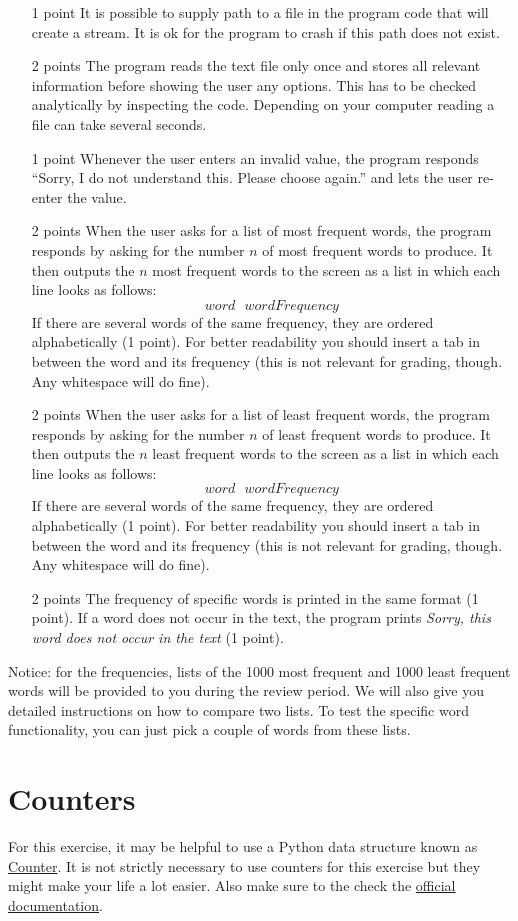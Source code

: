 \documentclass[11pt, leqno, a4paper]{article}
\begin{document}
\begin{itemize}
\item[1 point] It is possible to supply path to a file in the program code that will create a stream. It is ok for the program to crash if this path does not exist.
\item[2 points] The program reads the text file only once and stores all relevant information before showing the user any options. This has to
be checked analytically by inspecting the code. Depending on your computer reading a file can take several seconds.
\item[1 point] Whenever the user enters an invalid value, the program responds ``Sorry, I do not understand this. Please choose again.'' and lets the
user re-enter the value.
\item[2 points] When the user asks for a list of most frequent words, the program responds by asking for the number $ n $ of most frequent words to 
produce. It then outputs the $ n $ most frequent words to the screen as a list in which each line looks as follows:
$$ word~~~wordFrequency $$
If there are several words of the same frequency, they are ordered alphabetically (1 point). For better readability
you should insert a tab in between the word and its frequency (this is not relevant for grading, though. Any whitespace will do fine).
\item[2 points] When the user asks for a list of least frequent words, the program responds by asking for the number $ n $ of least frequent words to 
produce. It then outputs the $ n $ least frequent words to the screen as a list in which each line looks as follows:
$$ word~~~wordFrequency $$
If there are several words of the same frequency, they are ordered alphabetically (1 point).  For better readability
you should insert a tab in between the word and its frequency (this is not relevant for grading, though. Any whitespace will do fine).
\item[2 points] The frequency of specific words is printed in the same format (1 point). If a word does not occur in the text, the program prints \textit{Sorry, this
word does not occur in the text} (1 point).
\end{itemize}

Notice: for the frequencies, lists of the 1000 most frequent and 1000 least frequent words will be provided to you during the review period. We will also give
you detailed instructions on how to compare two lists. To test the specific word functionality, you can just pick a couple of words from these lists.

\enlargethispage{1cm}
\section{Counters}
For this exercise, it may be helpful to use a Python data structure known as 
\href{https://pymotw.com/3/collections/counter.html}{Counter}. It is not strictly necessary to use counters
for this exercise but they might make your life a lot easier. Also make sure to the check the
\href{https://docs.python.org/3/library/collections.html#collections.Counter}{official documentation}.
\end{document}
